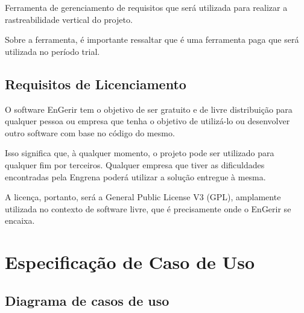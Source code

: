 Ferramenta de gerenciamento de requisitos que será utilizada para realizar a rastreabilidade vertical do projeto.

Sobre a ferramenta, é importante ressaltar que é uma ferramenta paga que será utilizada no período trial.

\section{Requisitos de Licenciamento}

O software EnGerir tem o objetivo de ser gratuito e de livre distribuição para qualquer pessoa ou empresa que tenha o objetivo de utilizá-lo ou desenvolver outro software com base no código do mesmo.

Isso significa que, à qualquer momento, o projeto pode ser utilizado para qualquer fim por terceiros. Qualquer empresa que tiver as dificuldades encontradas pela Engrena poderá utilizar a solução entregue à mesma.

A licença, portanto, será a General Public License V3 (GPL), amplamente utilizada no contexto de software livre, que é precisamente onde o EnGerir se encaixa.











































\chapter{Especificação de Caso de Uso}
\label{especificação_de_caso_de_uso}

\section{Diagrama de casos de uso}


